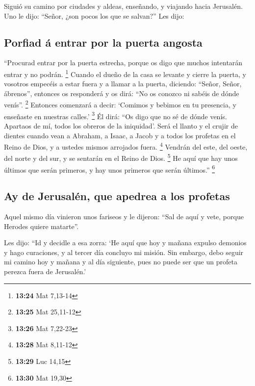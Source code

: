  Siguió su camino por ciudades y aldeas, enseñando, y
viajando hacia Jerusalén.  Uno le dijo: ``Señor, ¿son
pocos los que se salvan?'' Les dijo:

\hypertarget{porfiad-uxe1-entrar-por-la-puerta-angosta}{%
\subsection{Porfiad á entrar por la puerta
angosta}\label{porfiad-uxe1-entrar-por-la-puerta-angosta}}

 ``Procurad entrar por la puerta estrecha, porque os digo
que muchos intentarán entrar y no podrán. \footnote{\textbf{13:24} Mat
  7,13-14}  Cuando el dueño de la casa se levante y
cierre la puerta, y vosotros empecéis a estar fuera y a llamar a la
puerta, diciendo: ``Señor, Señor, ábrenos'', entonces os responderá y os
dirá: ``No os conozco ni sabéis de dónde venís''. \footnote{\textbf{13:25}
  Mat 25,11-12}  Entonces comenzará a decir: `Comimos y
bebimos en tu presencia, y enseñaste en nuestras calles.' \footnote{\textbf{13:26}
  Mat 7,22-23}  Él dirá: ``Os digo que no sé de dónde
venís. Apartaos de mí, todos los obreros de la iniquidad'.
 Será el llanto y el crujir de dientes cuando vean a
Abraham, a Isaac, a Jacob y a todos los profetas en el Reino de Dios, y
a ustedes mismos arrojados fuera. \footnote{\textbf{13:28} Mat 8,11-12}
 Vendrán del este, del oeste, del norte y del sur, y se
sentarán en el Reino de Dios. \footnote{\textbf{13:29} Luc 14,15}
 He aquí que hay unos últimos que serán primeros, y hay
unos primeros que serán últimos.'' \footnote{\textbf{13:30} Mat 19,30}

\hypertarget{ay-de-jerusaluxe9n-que-apedrea-a-los-profetas}{%
\subsection{Ay de Jerusalén, que apedrea a los
profetas}\label{ay-de-jerusaluxe9n-que-apedrea-a-los-profetas}}

 Aquel mismo día vinieron unos fariseos y le dijeron:
``Sal de aquí y vete, porque Herodes quiere matarte''.

 Les dijo: ``Id y decidle a esa zorra: `He aquí que hoy y
mañana expulso demonios y hago curaciones, y al tercer día concluyo mi
misión.  Sin embargo, debo seguir mi camino hoy y mañana
y al día siguiente, pues no puede ser que un profeta perezca fuera de
Jerusalén.'

